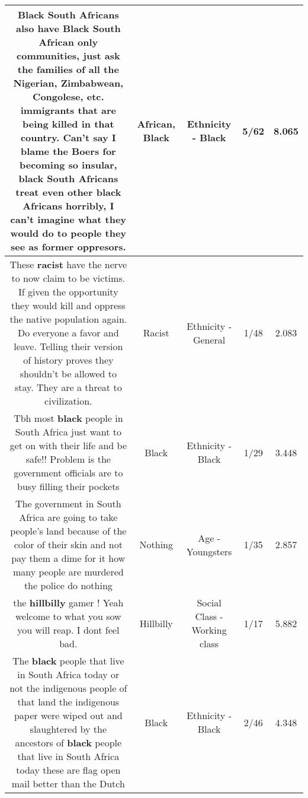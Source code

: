 \documentclass[11pt]{article}
\newlength\mylength
\begin{document}
\begin{center}
\begin{longtable}{|C{.65\mylength}|C{.30\mylength}|C{.12\mylength}|C{.12\mylength}|C{.12\mylength}|}
  \small Black South Africans also have \textbf{Black} South \textbf{African} only communities, just ask the families of all the Nigerian, Zimbabwean, Congolese, etc. immigrants that are being killed in that country. Can't say I blame the Boers for becoming so insular, \textbf{black} South Africans treat even other \textbf{black} Africans horribly, I can't imagine what they would do to people they see as former oppresors.\normalsize   & African, Black & Ethnicity - Black & 5/62 & 8.065 \\  \hline
  \small These \textbf{racist} have the nerve to now claim to be victims.  If given the opportunity they would kill and oppress the native population again.  Do everyone a favor and leave.  Telling their version of history proves they shouldn't be allowed to stay. They are a threat to civilization.\normalsize   & Racist & Ethnicity - General & 1/48 & 2.083 \\  \hline
  \small Tbh most \textbf{black} people in South Africa just want to get on with their life and be safe!! Problem is the government officials are to busy filling their pockets\normalsize   & Black & Ethnicity - Black & 1/29 & 3.448 \\  \hline
  \small The government in South Africa are going to take people's land because of the color of their skin and not pay them a dime for it how many people are murdered the police do nothing\normalsize   & Nothing & Age - Youngsters & 1/35 & 2.857 \\  \hline
  \small the \textbf{hillbilly} gamer ! Yeah welcome to what you sow you will reap. I dont feel bad.\normalsize   & Hillbilly & Social Class - Working class & 1/17 & 5.882 \\  \hline
  \small The \textbf{black} people that live in South Africa today or not the indigenous people of that land the indigenous paper were wiped out and slaughtered by the ancestors of \textbf{black} people that live in South Africa today these are flag open mail better than the Dutch\normalsize   & Black & Ethnicity - Black & 2/46 & 4.348 \\  \hline

\end{longtable}
\end{center}
\end{document}
